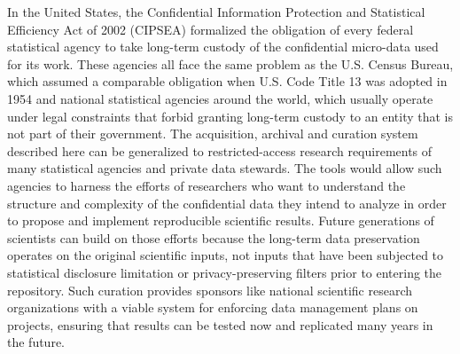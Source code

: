                       


In the United States, the Confidential Information Protection and
Statistical Efficiency Act of 2002 (CIPSEA) formalized the obligation of
every federal statistical agency to take long-term custody of the
confidential micro-data used for its work. These agencies all face the same
problem as the U.S. Census Bureau, which assumed a comparable obligation
when U.S. Code Title 13 was adopted in 1954 and national statistical
agencies around the world, which usually operate under legal constraints
that forbid granting long-term custody to an entity that is not part of
their government. The acquisition, archival and curation system described
here can be generalized to restricted-access research requirements of many
statistical agencies and private data stewards. The tools would allow such
agencies to harness the efforts of researchers who want to understand the
structure and complexity of the confidential data they intend to analyze in
order to propose and implement reproducible scientific results. Future
generations of scientists can build on those efforts because the long-term
data preservation operates on the original scientific inputs, not inputs
that have been subjected to statistical disclosure limitation or
privacy-preserving filters prior to entering the repository. Such curation
provides sponsors like national scientific research organizations with a
viable system for enforcing data management plans on projects, ensuring that
results can be tested now and replicated many years in the future.
